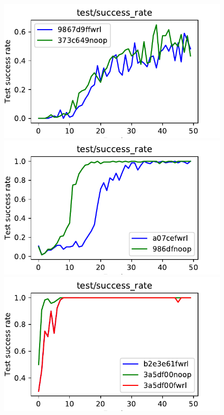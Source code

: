 
\begin{figure}
  \def\frac{0.32}
    \includegraphics[width=\frac\columnwidth]{media/res/373c649_FetchSlide-v1-noop/test/success_rate.pdf}%
    \includegraphics[width=\frac\columnwidth]{media/res/a077c9e_FetchPush-v1-fwrl/test/success_rate.pdf}%
    \includegraphics[width=\frac\columnwidth]{media/res/3a5df00_FetchReach-v1-fwrl/test/success_rate.pdf}\\

\end{figure}
